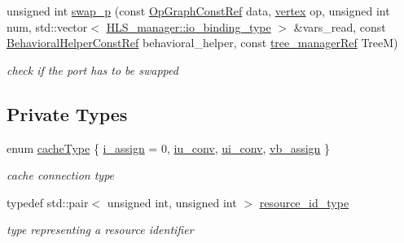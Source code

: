 \begin{DoxyCompactItemize}
unsigned int \hyperlink{classmux__connection__binding_a2eccd06bada7e07af12b2e14918dbbfa}{swap\+\_\+p} (const \hyperlink{op__graph_8hpp_a9a0b240622c47584bee6951a6f5de746}{Op\+Graph\+Const\+Ref} data, \hyperlink{graph_8hpp_abefdcf0544e601805af44eca032cca14}{vertex} op, unsigned int num, std\+::vector$<$ \hyperlink{classHLS__manager_a972627cc658afa992590b9d2bf1a1e87}{H\+L\+S\+\_\+manager\+::io\+\_\+binding\+\_\+type} $>$ \&vars\+\_\+read, const \hyperlink{behavioral__helper_8hpp_aae973b54cac87eef3b27442aa3e1e425}{Behavioral\+Helper\+Const\+Ref} behavioral\+\_\+helper, const \hyperlink{tree__manager_8hpp_a96ff150c071ce11a9a7a1e40590f205e}{tree\+\_\+manager\+Ref} TreeM)
\begin{DoxyCompactList}\small\item\em check if the port has to be swapped \end{DoxyCompactList}\end{DoxyCompactItemize}
\subsection*{Private Types}
\begin{DoxyCompactItemize}
\item 
enum \hyperlink{classmux__connection__binding_aaf8d69f505f7832b20e1b0c50c3b6efe}{cache\+Type} \{ \hyperlink{classmux__connection__binding_aaf8d69f505f7832b20e1b0c50c3b6efea680a23b7ae50154bd3365aa295e66c6f}{i\+\_\+assign} = 0, 
\hyperlink{classmux__connection__binding_aaf8d69f505f7832b20e1b0c50c3b6efeacebdc2e431d26d4676cc2ea7e2da6a05}{iu\+\_\+conv}, 
\hyperlink{classmux__connection__binding_aaf8d69f505f7832b20e1b0c50c3b6efea318417f204d85c7a81fbde6e7c687192}{ui\+\_\+conv}, 
\hyperlink{classmux__connection__binding_aaf8d69f505f7832b20e1b0c50c3b6efeaecb6949ff2f4dd7a4f7d41b9fff8cdcc}{vb\+\_\+assign}
 \}\begin{DoxyCompactList}\small\item\em cache connection type \end{DoxyCompactList}
\item 
typedef std\+::pair$<$ unsigned int, unsigned int $>$ \hyperlink{classmux__connection__binding_aa43c7eaf66a55ac97a5a7f57f6149025}{resource\+\_\+id\+\_\+type}
\begin{DoxyCompactList}\small\item\em type representing a resource identifier \end{DoxyCompactList}\end{DoxyCompactItemize}
